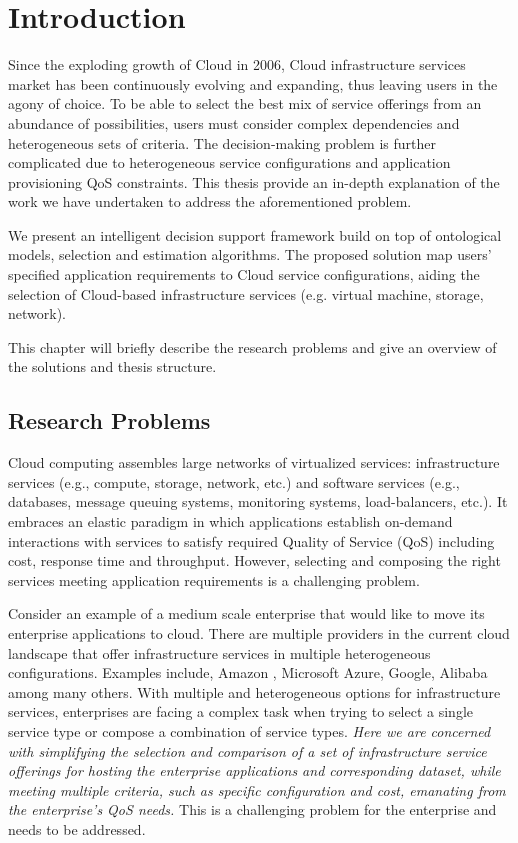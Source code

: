 \chapter{Introduction}
\label{cha:intro}
Since the exploding growth of Cloud in 2006, 
Cloud infrastructure services market has been continuously evolving and expanding,
thus leaving users in the agony of choice. To be
able to select the best mix of service offerings from an
abundance of possibilities, users must consider complex 
dependencies and heterogeneous sets of criteria. 
The decision-making problem is
further complicated due to heterogeneous service configurations
and application provisioning QoS constraints. 
This thesis provide an in-depth explanation of the work we have undertaken to address the aforementioned problem.

We present an intelligent decision support framework build on top of ontological models, selection and estimation algorithms.
The proposed solution map users’ specified application
requirements to Cloud service configurations, aiding the selection 
of Cloud-based infrastructure services (e.g. virtual machine, storage, network).

This chapter will briefly describe the research problems and give an overview of the solutions and thesis structure.

\section{Research Problems}
\label{sec:research_problem}

Cloud computing
\cite{5071863,Armbrust:2010:VCC:1721654.1721672,CloudComputingMethodologySystemsApplications}
assembles large networks of virtualized services:
infrastructure services (e.g., compute, storage, network, etc.) and software services
(e.g., databases, message queuing systems, monitoring systems, load-balancers, etc.).
It embraces an elastic paradigm in which applications establish on-demand
interactions with services to satisfy required Quality of Service (QoS) including cost,
response time and throughput. However, selecting and composing the right services
meeting application requirements is a challenging problem.

Consider an example of a medium scale enterprise that would like to move its
enterprise applications to cloud. There are multiple providers in the current cloud
landscape that offer infrastructure services in multiple heterogeneous configurations.
Examples include, Amazon , Microsoft Azure, Google, Alibaba among many others.
With multiple and heterogeneous options for infrastructure services, enterprises are facing a complex task when trying to select a single service type or compose a combination of service types.
\textit{Here we are concerned with simplifying the selection and comparison of a set of
infrastructure service offerings for hosting the enterprise applications and
corresponding dataset, while meeting multiple criteria, such as specific configuration
and cost, emanating from the enterprise’s QoS needs.}
This is a challenging problem for the enterprise and needs to be addressed.

